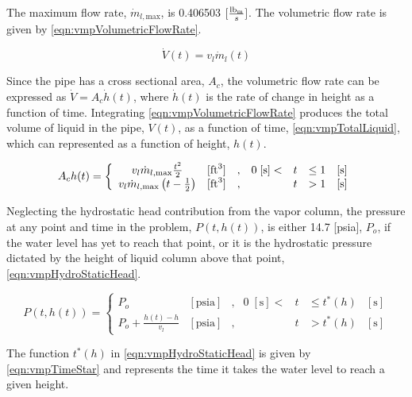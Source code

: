 The maximum flow rate, $\dot{m}_{l,\text{max}}$, is 0.406503 $ [ \frac{\lbm{}}{s} ]$.
The volumetric flow rate is given by \eqref{eqn:vmpVolumetricFlowRate}.

\begin{equation}
\label{eqn:vmpVolumetricFlowRate}
\dot{V}(t) = v_{l} \dot{m}_{l}(t)
\end{equation}

Since the pipe has a cross sectional area, $A_{c}$, the volumetric flow rate can be expressed as $\dot{V} = A_{c} \dot{h}(t)$, where $\dot{h}(t)$ is the rate of change in height as a function of time.
Integrating \eqref{eqn:vmpVolumetricFlowRate} produces the total volume of liquid in the pipe, $V(t)$, as a function of time, \eqref{eqn:vmpTotalLiquid}, which can represented as a function of height, $h(t)$.

\begin{equation}
\label{eqn:vmpTotalLiquid}
A_{c} h(t) = 
 \left\{
\begin{array}{cclrcll}
v_{l} \dot{m}_{l,\text{max}}\frac{t^{2}}{2} & [ \text{ft}^{3} ] & , & 0\; [\text{s}] < & t & \leq 1 & [\text{s}] \\
v_{l} \dot{m}_{l,\text{max}} \left( t - \onehalf  \right) & [ \text{ft}^{3} ] & , &                  & t & > 1    & [\text{s}]
\end{array}\right.
\end{equation}

Neglecting the hydrostatic head contribution from the vapor column, the pressure at any point and time in the problem, $P(t, h(t))$, is either 14.7 [psia], $P_o$, if the water level has yet to reach that point, or it is the hydrostatic pressure dictated by the height of liquid column above that point, \eqref{eqn:vmpHydroStaticHead}.

\begin{equation}
\label{eqn:vmpHydroStaticHead}
P(t, h(t))= 
 \left\{
\begin{array}{cclrcll}
P_o & [ \text{psia} ] & , & 0\; [\text{s}] < & t & \leq t^{*}(h) & [\text{s}] \\
P_o + \frac{ h(t) - h }{ v_{l} } & [ \text{psia} ] & , &  & t & > t^{*}(h) & [\text{s}]
\end{array}\right.
\end{equation}

The function $t^{*}(h)$ in \eqref{eqn:vmpHydroStaticHead} is given by \eqref{eqn:vmpTimeStar} and represents the time it takes the water level to reach a given height.

